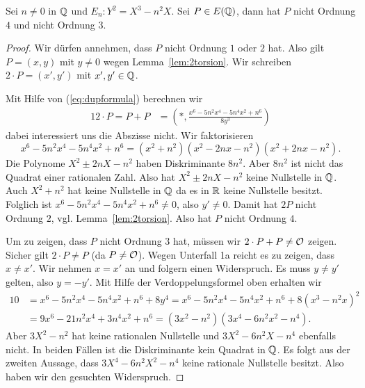 \begin{lemma}
  \label{len:noorder4}
  Sei $n\not=0$ in ${\mathbb{Q}}$ und $E_n:Y^2 = X^3-n^2X$. Sei $P\in E({\mathbb{Q}})$,
  dann hat $P$ nicht Ordnung $4$ und nicht Ordnung $3$. 
\end{lemma}
\begin{proof}
  Wir dürfen annehmen, dass $P$ nicht
  Ordnung $1$ oder $2$ hat. Also gilt $P=(x,y)$ mit  $y\not=0$ wegen Lemma~\ref{lem:2torsion}.
  Wir schreiben  
  $2\cdot P=(x',y')$ mit $x',y'\in {\mathbb{Q}}$.

  Mit Hilfe von (\ref{eq:dupformula}) berechnen wir
  \begin{alignat*}1
    2\cdot P= P+P %
    &= \left(*, \frac{x^6 - 5n^2x^4 - 5n^4x^2 + n^6}{8y^3}\right)
  \end{alignat*}
  dabei interessiert uns die Abszisse nicht.
  Wir faktorisieren
  $$
  x^6 - 5n^2x^4 - 5n^4x^2 + n^6 = (x^2+n^2)(x^2-2nx-n^2)(x^2+2nx-n^2). 
  $$
  Die Polynome $X^2\pm 2nX-n^2$ haben Diskriminante $8n^2$. Aber
  $8n^2$ ist nicht das Quadrat einer rationalen Zahl. Also hat $X^2\pm
  2nX-n^2$ keine Nullstelle in ${\mathbb{Q}}$. Auch $X^2+n^2$ hat keine
  Nullstelle in ${\mathbb{Q}}$ da es in ${\mathbb{R}}$ keine Nullstelle besitzt. Folglich ist
  $x^6 - 5n^2x^4 - 5n^4x^2 + n^6\not=0$, also $y'\not=0$. Damit hat $2P$ nicht
  Ordnung $2$, vgl. Lemma~\ref{lem:2torsion}. Also hat $P$ nicht
  Ordnung $4$. 

  Um zu zeigen, dass $P$ nicht Ordnung $3$ hat, müssen wir $2\cdot P +
  P \not={\mathcal O}$ zeigen.
  Sicher gilt $2\cdot P \not=P$ (da $P\not={\mathcal O}$).
  Wegen Unterfall 1a reicht es zu zeigen, dass
  $x\not=x'$. Wir nehmen $x=x'$ an und folgern einen Widerspruch. Es
  muss $y\not=y'$ gelten, also $y=-y'$. Mit Hilfe der
  Verdoppelungsformel oben erhalten wir
  \begin{alignat*}1
    0&=    x^6-5n^2x^4-5n^4x^2+n^6 + 8y^4 =
    x^6-5n^2x^4-5n^4x^2+n^6 + 8(x^3-n^2 x)^2\\
    &=9x^6 - 21n^2x^4 + 3n^4x^2 + n^6 =
    (3x^2-n^2)(3x^4-6n^2x^2-n^4).
  \end{alignat*}
  Aber $3X^2-n^2$ hat keine rationalen Nullstelle
  und $3X^2-6n^2X-n^4$ ebenfalls nicht. In beiden Fällen ist die
  Diskriminante kein Quadrat in ${\mathbb{Q}}$.
    Es folgt aus der zweiten Aussage, dass
  $3X^4-6n^2X^2-n^4$ keine rationale Nullstelle besitzt. Also haben
  wir den gesuchten Widerspruch.
\end{proof}


